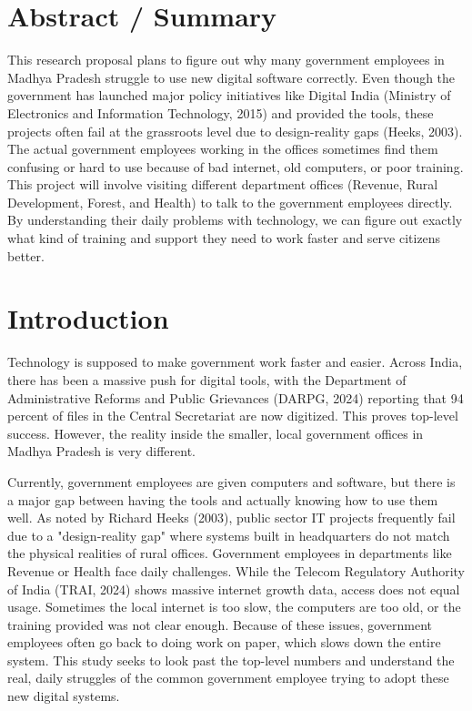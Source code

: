 \documentclass[11pt,a4paper]{article}
\begin{document}
\newpage

\section{Abstract / Summary}

\vspace{0.2cm}
This research proposal plans to figure out why many government employees in Madhya Pradesh struggle to use new digital software correctly. Even though the government has launched major policy initiatives like Digital India (Ministry of Electronics and Information Technology, 2015) and provided the tools, these projects often fail at the grassroots level due to design-reality gaps (Heeks, 2003). The actual government employees working in the offices sometimes find them confusing or hard to use because of bad internet, old computers, or poor training. This project will involve visiting different department offices (Revenue, Rural Development, Forest, and Health) to talk to the government employees directly. By understanding their daily problems with technology, we can figure out exactly what kind of training and support they need to work faster and serve citizens better.

\section{Introduction}

\vspace{0.2cm}
Technology is supposed to make government work faster and easier. Across India, there has been a massive push for digital tools, with the Department of Administrative Reforms and Public Grievances (DARPG, 2024) reporting that 94 percent of files in the Central Secretariat are now digitized. This proves top-level success. However, the reality inside the smaller, local government offices in Madhya Pradesh is very different. 

Currently, government employees are given computers and software, but there is a major gap between having the tools and actually knowing how to use them well. As noted by Richard Heeks (2003), public sector IT projects frequently fail due to a "design-reality gap" where systems built in headquarters do not match the physical realities of rural offices. Government employees in departments like Revenue or Health face daily challenges. While the Telecom Regulatory Authority of India (TRAI, 2024) shows massive internet growth data, access does not equal usage. Sometimes the local internet is too slow, the computers are too old, or the training provided was not clear enough. Because of these issues, government employees often go back to doing work on paper, which slows down the entire system. This study seeks to look past the top-level numbers and understand the real, daily struggles of the common government employee trying to adopt these new digital systems. 
\end{document}
